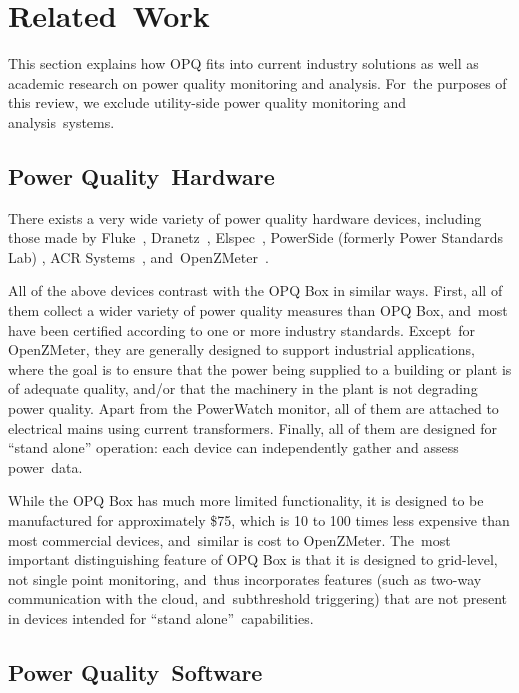 \documentclass[energies,article,accept,moreauthors,pdftex]{Definitions/mdpi}
\begin{document}
\section{Related~Work}
\label{sec:related-work}

This section explains how OPQ fits into current industry solutions as well as academic research on power quality monitoring and analysis. For~the purposes of this review, we exclude utility-side power quality monitoring and analysis~systems.

\subsection{Power Quality~Hardware}
\label{sec:commercial-pq-devices}

There exists a very wide variety of power quality hardware devices, including those made by Fluke~\cite{fluke_fluke_2020}, Dranetz~\cite{dranetz_dranetz_2020}, Elspec~\cite{elspec_elspec_2020}, PowerSide (formerly Power Standards Lab) \cite{powerside_powerside_2020}, ACR Systems~\cite{acr_acr_2020}, and~OpenZMeter~\cite{viciana_openzmeter_2018}.

All of the above devices contrast with the OPQ Box in similar ways. First, all of them collect a wider variety of power quality measures than OPQ Box, and~most have been certified according to one or more industry standards. Except~for OpenZMeter, they are generally designed to support industrial applications, where the goal is to ensure that the power being supplied to a building or plant is of adequate quality, and/or that the machinery in the plant is not degrading power quality. Apart from the PowerWatch monitor, all of them are attached to electrical mains using current transformers. Finally, all of them are designed for “stand alone” operation: each device can independently gather and assess power~data.

While the OPQ Box has much more limited functionality, it is designed to be manufactured for approximately \$75, which is 10 to 100 times less expensive than most commercial devices, and~similar is cost to OpenZMeter. The~most important distinguishing feature of OPQ Box is that it is designed to grid-level, not single point monitoring, and~thus incorporates features (such as two-way communication with the cloud, and~subthreshold triggering) that are not present in devices intended for ``stand alone''~capabilities.

\subsection{Power Quality~Software}
\label{sec:commercial-pq-software}
\end{document}
